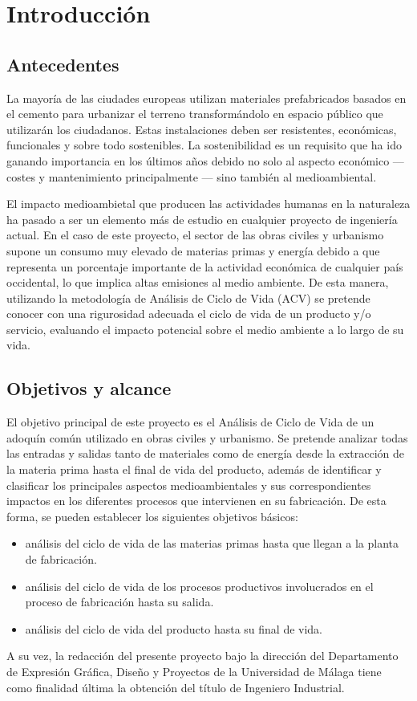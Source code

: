 \chapter{Introducción}
\section{Antecedentes}

La mayoría de las ciudades europeas utilizan materiales prefabricados basados en el cemento para urbanizar el terreno transformándolo en espacio público que utilizarán los ciudadanos. Estas instalaciones deben ser resistentes, económicas, funcionales y sobre todo sostenibles. La sostenibilidad es un requisito que ha ido ganando importancia en los últimos años debido no solo al aspecto económico — costes y mantenimiento principalmente — sino también al medioambiental.

El impacto medioambietal que producen las actividades humanas en la naturaleza ha pasado a ser un elemento más de estudio en cualquier proyecto de ingeniería actual. En el caso de este proyecto, el sector de las obras civiles y urbanismo supone un consumo muy elevado de materias primas y energía debido a que representa un porcentaje importante de la actividad económica de cualquier país occidental, lo que implica altas emisiones al medio ambiente.
De esta manera, utilizando la metodología de Análisis de Ciclo de Vida (ACV) se pretende conocer con una rigurosidad adecuada el ciclo de vida de un producto y/o servicio, evaluando el impacto potencial sobre el medio ambiente a lo largo de su vida.

\section{Objetivos y alcance}
El objetivo principal de este proyecto es el Análisis de Ciclo de Vida de un adoquín común utilizado en obras civiles y urbanismo. Se pretende analizar todas las entradas y salidas tanto de materiales como de energía desde la extracción de la materia prima hasta el final de vida del producto, además de identificar y clasificar los principales aspectos medioambientales y sus correspondientes impactos en los diferentes procesos que intervienen en su fabricación. De esta forma, se pueden establecer los siguientes objetivos básicos:
\begin{itemize}
\item análisis del ciclo de vida de las materias primas hasta que llegan a la planta de fabricación.
\item análisis del ciclo de vida de los procesos productivos involucrados en el proceso de fabricación hasta su salida.
\item análisis del ciclo de vida del producto hasta su final de vida.
\end{itemize}

A su vez, la redacción del presente proyecto bajo la dirección del Departamento de Expresión Gráfica, Diseño y Proyectos de la Universidad de Málaga tiene como finalidad última la obtención del título de Ingeniero Industrial.
